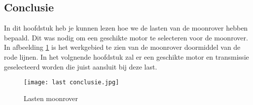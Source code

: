 \newpage

\subsection{Conclusie}
In dit hoofdstuk heb je kunnen lezen hoe we de lasten van de moonrover hebben bepaald. Dit was nodig om een geschikte motor te selecteren voor de moonrover.  In afbeelding \ref{fig:lasten moonrover} is het werkgebied te zien van de moonrover doormiddel van de rode lijnen. In het volgnende hoofdstuk zal er een geschikte motor en transmissie geselecteerd worden die juist aansluit bij deze last. 

\begin{figure}[H]
    \centering
    \texttt{[image: last conclusie.jpg]}
    \caption{Lasten moonrover}
    \label{fig:lasten moonrover}
\end{figure}
    
